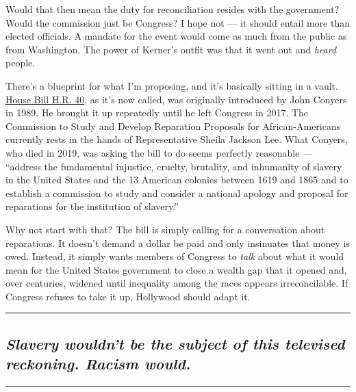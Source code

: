 Would that then mean the duty for reconciliation resides with the
government? Would the commission just be Congress? I hope not --- it
should entail more than elected officials. A mandate for the event would
come as much from the public as from Washington. The power of Kerner's
outfit was that it went out and \emph{heard} people.

There's a blueprint for what I'm proposing, and it's basically sitting
in a vault.
\href{https://www.nytimes3xbfgragh.onion/2019/06/19/us/politics/slavery-reparations-hearing.html}{House
Bill H.R. 40}, as it's now called, was originally introduced by John
Conyers in 1989. He brought it up repeatedly until he left Congress in
2017. The Commission to Study and Develop Reparation Proposals for
African-Americans currently rests in the hands of Representative Sheila
Jackson Lee. What Conyers, who died in 2019, was asking the bill to do
seems perfectly reasonable --- ``address the fundamental injustice,
cruelty, brutality, and inhumanity of slavery in the United States and
the 13 American colonies between 1619 and 1865 and to establish a
commission to study and consider a national apology and proposal for
reparations for the institution of slavery.''

Why not start with that? The bill is simply calling for a conversation
about reparations. It doesn't demand a dollar be paid and only
insinuates that money is owed. Instead, it simply wants members of
Congress to \emph{talk} about what it would mean for the United States
government to close a wealth gap that it opened and, over centuries,
widened until inequality among the races appears irreconcilable. If
Congress refuses to take it up, Hollywood should adapt it.

\begin{center}\rule{0.5\linewidth}{\linethickness}\end{center}

\hypertarget{slavery-wouldnt-be-the-subject-of-this-televised-reckoning-racism-would}{%
\subsection{\texorpdfstring{\emph{Slavery wouldn't be the subject of
this televised reckoning. Racism
would.}}{Slavery wouldn't be the subject of this televised reckoning. Racism would.}}\label{slavery-wouldnt-be-the-subject-of-this-televised-reckoning-racism-would}}

\begin{center}\rule{0.5\linewidth}{\linethickness}\end{center}

